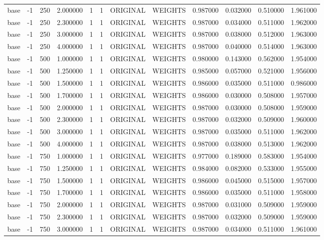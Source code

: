 \begin{tabular}{lrrrllllrrrr}
base & -1 & 250 & 2.000000 & 1 & 1 & ORIGINAL & WEIGHTS & 0.987000 & 0.032000 & 0.510000 & 1.961000 \\
base & -1 & 250 & 2.300000 & 1 & 1 & ORIGINAL & WEIGHTS & 0.987000 & 0.034000 & 0.511000 & 1.962000 \\
base & -1 & 250 & 3.000000 & 1 & 1 & ORIGINAL & WEIGHTS & 0.987000 & 0.038000 & 0.512000 & 1.963000 \\
base & -1 & 250 & 4.000000 & 1 & 1 & ORIGINAL & WEIGHTS & 0.987000 & 0.040000 & 0.514000 & 1.963000 \\
base & -1 & 500 & 1.000000 & 1 & 1 & ORIGINAL & WEIGHTS & 0.980000 & 0.143000 & 0.562000 & 1.954000 \\
base & -1 & 500 & 1.250000 & 1 & 1 & ORIGINAL & WEIGHTS & 0.985000 & 0.057000 & 0.521000 & 1.956000 \\
base & -1 & 500 & 1.500000 & 1 & 1 & ORIGINAL & WEIGHTS & 0.986000 & 0.035000 & 0.511000 & 0.986000 \\
base & -1 & 500 & 1.700000 & 1 & 1 & ORIGINAL & WEIGHTS & 0.986000 & 0.030000 & 0.508000 & 1.957000 \\
base & -1 & 500 & 2.000000 & 1 & 1 & ORIGINAL & WEIGHTS & 0.987000 & 0.030000 & 0.508000 & 1.959000 \\
base & -1 & 500 & 2.300000 & 1 & 1 & ORIGINAL & WEIGHTS & 0.987000 & 0.032000 & 0.509000 & 1.960000 \\
base & -1 & 500 & 3.000000 & 1 & 1 & ORIGINAL & WEIGHTS & 0.987000 & 0.035000 & 0.511000 & 1.962000 \\
base & -1 & 500 & 4.000000 & 1 & 1 & ORIGINAL & WEIGHTS & 0.987000 & 0.038000 & 0.513000 & 1.962000 \\
base & -1 & 750 & 1.000000 & 1 & 1 & ORIGINAL & WEIGHTS & 0.977000 & 0.189000 & 0.583000 & 1.954000 \\
base & -1 & 750 & 1.250000 & 1 & 1 & ORIGINAL & WEIGHTS & 0.984000 & 0.082000 & 0.533000 & 1.955000 \\
base & -1 & 750 & 1.500000 & 1 & 1 & ORIGINAL & WEIGHTS & 0.986000 & 0.045000 & 0.515000 & 1.957000 \\
base & -1 & 750 & 1.700000 & 1 & 1 & ORIGINAL & WEIGHTS & 0.986000 & 0.035000 & 0.511000 & 1.958000 \\
base & -1 & 750 & 2.000000 & 1 & 1 & ORIGINAL & WEIGHTS & 0.987000 & 0.031000 & 0.509000 & 1.959000 \\
base & -1 & 750 & 2.300000 & 1 & 1 & ORIGINAL & WEIGHTS & 0.987000 & 0.032000 & 0.509000 & 1.959000 \\
base & -1 & 750 & 3.000000 & 1 & 1 & ORIGINAL & WEIGHTS & 0.987000 & 0.034000 & 0.511000 & 1.961000 \\

\end{tabular}
